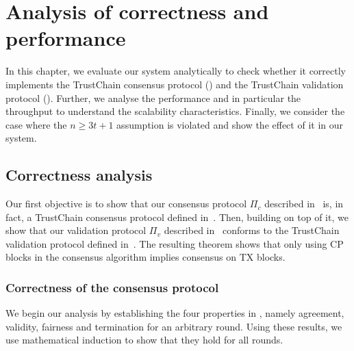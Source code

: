 \chapter{Analysis of correctness and performance}
\label{ch:analysis}

In this chapter,
we evaluate our system analytically to check whether it correctly implements the TrustChain consensus protocol ()
and the TrustChain validation protocol ().
Further, we analyse the performance and in particular the throughput to understand the scalability characteristics.
Finally, we consider the case where the $n \ge 3t + 1$ assumption is violated and show the effect of it in our system.

\section{Correctness analysis}
\label{sec:correctness}
Our first objective is to show that our consensus protocol $\Pi_c$ described in~ is,
in fact, a TrustChain consensus protocol defined in~.
Then, building on top of it, we show that our validation protocol $\Pi_v$ described in~ conforms to the TrustChain validation protocol defined in~.
The resulting theorem shows that only using CP blocks in the consensus algorithm implies consensus on TX blocks.


\subsection{Correctness of the consensus protocol}

We begin our analysis by establishing the four properties in ,
namely agreement, validity, fairness and termination for an arbitrary round.
Using these results, we use mathematical induction to show that they hold for all rounds.

